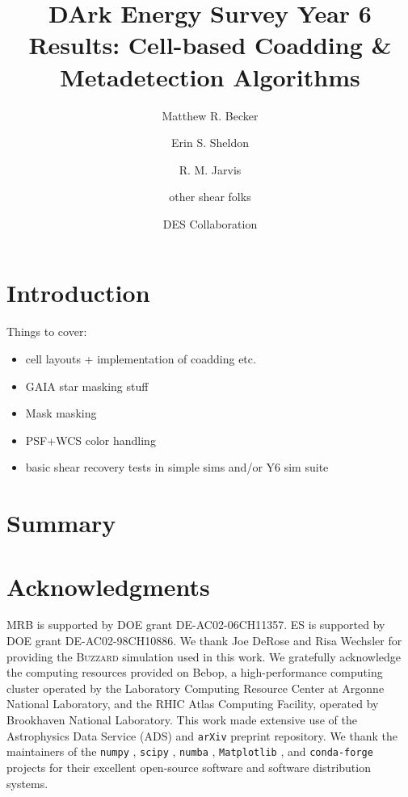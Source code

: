 \documentclass[twocolumn]{openjournal}
\makeatletter
\newcommand{\buzzard}{\textsc{Buzzard}\@\xspace}
\makeatother
\begin{document}
\title{DArk Energy Survey Year 6 Results: Cell-based Coadding \& Metadetection Algorithms}

\author{Matthew R. Becker}
\author{Erin S. Sheldon}
\author{R. M. Jarvis}
\author{other shear folks}
\author{DES Collaboration}

\begin{abstract}

\end{abstract}


\section{Introduction}\label{sec:intro}

Things to cover:
\begin{itemize}
\item cell layouts + implementation of coadding etc.
\item GAIA star masking stuff
\item Mask masking
\item PSF+WCS color handling
\item basic shear recovery tests in simple sims and/or Y6 sim suite
\end{itemize}

\section{Summary}\label{sec:conc}


\section*{Acknowledgments}

MRB is supported by DOE grant DE-AC02-06CH11357. ES is supported by DOE grant
DE-AC02-98CH10886. We thank Joe DeRose and Risa Wechsler for providing the \buzzard
simulation used in this work. We gratefully acknowledge the computing resources provided
on Bebop, a high-performance computing cluster operated by the Laboratory Computing
Resource Center at Argonne National Laboratory, and the RHIC Atlas Computing Facility,
operated by Brookhaven National Laboratory. This work made extensive use of the
Astrophysics Data Service (ADS) and \texttt{arXiv} preprint repository. We thank the
maintainers of the \texttt{numpy} \citep{numpy}, \texttt{scipy} \citep{scipy},
\texttt{numba} \citep{numba}, \texttt{Matplotlib} \citep{matplotlib}, and
\texttt{conda-forge} \citep{condaforge} projects for their excellent open-source
software and software distribution systems.




\end{document}
